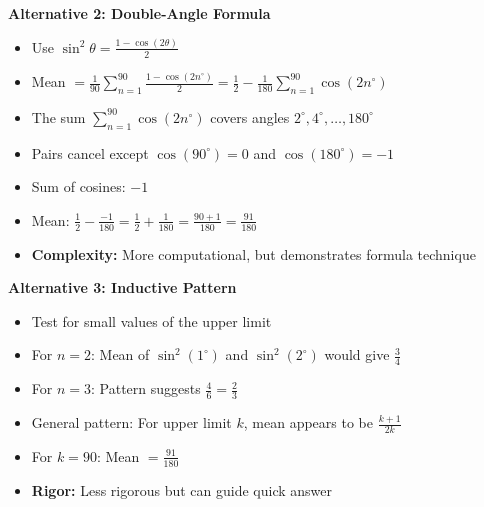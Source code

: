 \documentclass[12pt]{article}
\begin{document}
\begin{solutionbox}
\textbf{Alternative 2: Double-Angle Formula}
\begin{itemize}
    \item Use $\sin^2\theta = \frac{1 - \cos(2\theta)}{2}$
    \item Mean $= \frac{1}{90}\sum_{n=1}^{90}\frac{1-\cos(2n^{\circ})}{2} = \frac{1}{2} - \frac{1}{180}\sum_{n=1}^{90}\cos(2n^{\circ})$
    \item The sum $\sum_{n=1}^{90}\cos(2n^{\circ})$ covers angles $2^{\circ}, 4^{\circ}, \ldots, 180^{\circ}$
    \item Pairs cancel except $\cos(90^{\circ}) = 0$ and $\cos(180^{\circ}) = -1$
    \item Sum of cosines: $-1$
    \item Mean: $\frac{1}{2} - \frac{-1}{180} = \frac{1}{2} + \frac{1}{180} = \frac{90 + 1}{180} = \frac{91}{180}$
    \item \textbf{Complexity:} More computational, but demonstrates formula technique
\end{itemize}

\textbf{Alternative 3: Inductive Pattern}
\begin{itemize}
    \item Test for small values of the upper limit
    \item For $n = 2$: Mean of $\sin^2(1^{\circ})$ and $\sin^2(2^{\circ})$ would give $\frac{3}{4}$
    \item For $n = 3$: Pattern suggests $\frac{4}{6} = \frac{2}{3}$
    \item General pattern: For upper limit $k$, mean appears to be $\frac{k+1}{2k}$
    \item For $k = 90$: Mean $= \frac{91}{180}$
    \item \textbf{Rigor:} Less rigorous but can guide quick answer
\end{itemize}
\end{solutionbox}

\vspace{1em}
\end{document}

